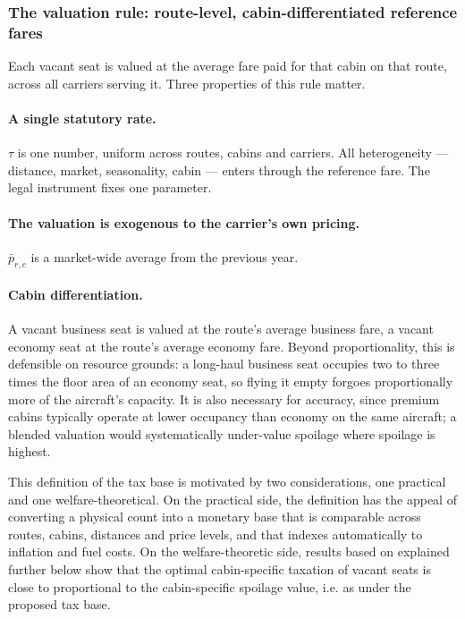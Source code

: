 \documentclass{article}
\begin{document}
\subsubsection{The valuation rule: route-level, cabin-differentiated reference fares}
Each vacant seat is valued at the average fare paid for that cabin on that route, across all carriers serving it. Three properties of this rule matter.

\paragraph{A single statutory rate.} $\tau$ is one number, uniform across routes, cabins and carriers. All heterogeneity --- distance, market, seasonality, cabin --- enters through the reference fare. The legal instrument fixes one parameter.

\paragraph{The valuation is exogenous to the carrier's own pricing.} $\bar{p}_{r,c}$ is a market-wide average from the previous year. 

\paragraph{Cabin differentiation.} A vacant business seat is valued at the route's average business fare, a vacant economy seat at the route's average economy fare. Beyond proportionality, this is defensible on resource grounds: a long-haul business seat occupies two to three times the floor area of an economy seat, so flying it empty forgoes proportionally more of the aircraft's capacity. It is also necessary for accuracy, since premium cabins typically operate at lower occupancy than economy on the same aircraft; a blended valuation would systematically under-value spoilage where spoilage is highest.

This definition of the tax base is motivated by two considerations, one practical and one welfare-theoretical. On the practical side, the definition has the appeal of converting a physical count into a monetary base that is comparable across routes, cabins, distances and price levels, and that indexes automatically to inflation and fuel costs. On the welfare-theoretic side, results based on \citet{Dörpinghaus_et_al_2026} explained further below show 
that the optimal cabin-specific taxation of vacant seats is close to proportional to the cabin-specific spoilage value, i.e. as under the proposed tax base.
\end{document}
